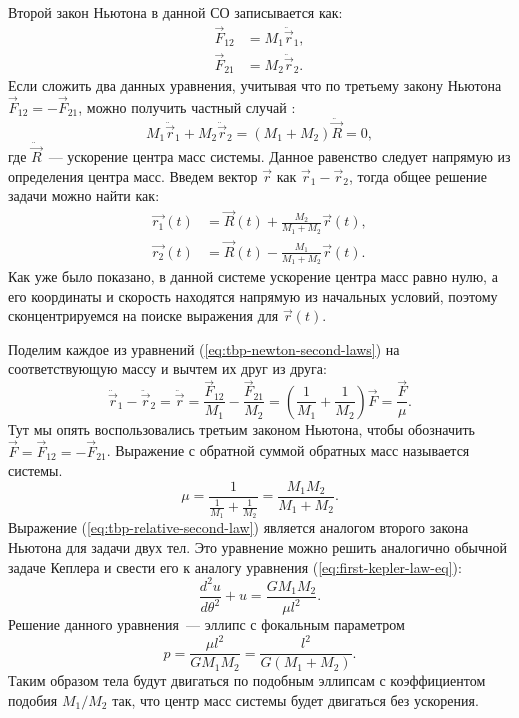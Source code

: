 Второй закон Ньютона в данной СО записывается как:
\begin{equation}
\begin{aligned}
	\vec{F}_{12} &= M_1 \ddot{\vec{r}}_1,\\
	\vec{F}_{21} &= M_2 \ddot{\vec{r}}_2.
\end{aligned}
\label{eq:tbp-newton-second-laws}
\end{equation}
Если сложить два данных уравнения, учитывая что по третьему закону Ньютона $\vec{F}_{12} = -\vec{F}_{21}$, можно получить частный случай :
\begin{equation*}
	M_1 \ddot{\vec{r}}_1 + M_2 \ddot{\vec{r}}_2 = (M_1 + M_2) \ddot{\vec{R}} = 0,
\end{equation*}
где $\ddot{\vec{R}}$~--- ускорение центра масс системы. Данное равенство следует напрямую из определения центра масс. %
Введем вектор $\vec{r}$ как $\vec{r}_1-\vec{r}_2$, тогда общее решение задачи можно найти как:
\begin{equation}
\begin{aligned}
	\vec{r_1}(t) &= \vec{R}(t) + \frac{M_2}{M_1 + M_2} \vec{r}(t), \\
	\vec{r_2}(t) &= \vec{R}(t) - \frac{M_1}{M_1 + M_2} \vec{r}(t).
\end{aligned}
\end{equation}
Как уже было показано, в данной системе ускорение центра масс равно нулю, а его координаты и скорость находятся напрямую из начальных условий, поэтому сконцентрируемся на поиске выражения для $\vec{r}(t)$.

Поделим каждое из уравнений (\ref{eq:tbp-newton-second-laws}) на соответствующую массу и вычтем их друг из друга:
\begin{equation}
	\ddot{\vec{r}}_1 - \ddot{\vec{r}}_2 = \ddot{\vec{r}} = \frac{\vec{F}_{12}}{M_1}-\frac{\vec{F}_{21}}{M_2} = \left(\frac{1}{M_1}+\frac{1}{M_2}\right) \vec{F} = \frac{\vec{F}}{\mu}.
	\label{eq:tbp-relative-second-law}
\end{equation}
Тут мы опять воспользовались третьим законом Ньютона, чтобы обозначить $\vec{F} = \vec{F}_12 = -\vec{F}_21$. Выражение с обратной суммой обратных масс называется  системы.
\begin{equation}
	\mu = \frac{1}{\frac{1}{M_1} + \frac{1}{M_2}} = \frac{M_1 M_2}{M_1 + M_2}.
\end{equation}
Выражение (\ref{eq:tbp-relative-second-law}) является аналогом второго закона Ньютона для задачи двух тел. Это уравнение можно решить аналогично обычной задаче Кеплера и свести его к аналогу уравнения (\ref{eq:first-kepler-law-eq}):
\begin{equation}
	\frac{d^2 u}{d \theta^2} + u = \frac{GM_1 M_2}{\mu l^2}.
\end{equation}
Решение данного уравнения~--- эллипс с фокальным параметром
\begin{equation*}
	p = \frac{\mu l^2}{GM_1 M_2} = \frac{l^2}{G(M_1 + M_2)}.
\end{equation*}
Таким образом тела будут двигаться по подобным эллипсам с коэффициентом подобия $M_1/M_2$ так, что центр масс системы будет двигаться без ускорения.

